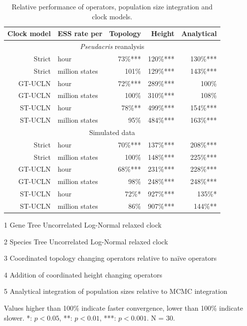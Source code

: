 \documentclass[nogrid]{MBE}%
\begin{document}
\begin{table}[htb!]
\caption{Relative performance of operators, population size integration and clock models.}
\label{tab:convergenceLM}
\begin{threeparttable}
\begin{tabular*}{\textwidth}{@{\extracolsep{\fill}}rlrrr@{}}
\hline
Clock model & ESS rate per & Topology\tnote{3} & Height\tnote{4} & Analytical\tnote{5}\tabularnewline
\hline
\multicolumn{5}{c}{\textit{Pseudacris} reanalysis}\tabularnewline
\hline
Strict & hour & 73\%{***} & 120\%{***} & 130\%{***}\tabularnewline
Strict & million states & 101\%\hphantom{***} & 129\%{***} & 143\%{***}\tabularnewline
GT-UCLN\tnote{1} & hour & 72\%{***} & 289\%{***} & 100\%\hphantom{***}\tabularnewline
GT-UCLN & million states & 100\%\hphantom{***} & 310\%{***} & 108\%\hphantom{***}\tabularnewline
ST-UCLN\tnote{2} & hour & 78\%{**}\hphantom{*} & 499\%{***} & 154\%{***}\tabularnewline
ST-UCLN & million states & 95\%\hphantom{***} & 484\%{***} & 163\%{***}\tabularnewline
\hline
\multicolumn{5}{c}{Simulated data}\tabularnewline
\hline
Strict & hour & 70\%{***} & 137\%{***} & 208\%{***}\tabularnewline
Strict & million states & 100\%\hphantom{***} & 148\%{***} & 225\%{***}\tabularnewline
GT-UCLN & hour & 68\%{***} & 231\%{***} & 228\%{***}\tabularnewline
GT-UCLN & million states & 98\%\hphantom{***} & 248\%{***} & 248\%{***}\tabularnewline
ST-UCLN & hour & 72\%{*}\hphantom{**} & 927\%{***} & 135\%{*}\hphantom{**}\tabularnewline
ST-UCLN & million states & 86\%\hphantom{***} & 907\%{***} & 144\%{**}\hphantom{*}\tabularnewline
\hline
\end{tabular*}
\begin{tablenotes}
\item[1] Gene Tree Uncorrelated Log-Normal relaxed clock
\item[2] Species Tree Uncorrelated Log-Normal relaxed clock
\item[3] Coordinated topology changing operators relative to na\"ive operators
\item[4] Addition of coordinated height changing operators
\item[5] Analytical integration of population sizes relative to MCMC integration
\item Values higher than 100\% indicate faster convergence, lower than 100\% indicate slower. {*}: $p < 0.05$, {**}: $p < 0.01$, {***}: $p < 0.001$. N = 30.
\end{tablenotes}
\end{threeparttable}
\end{table}
\end{document}
